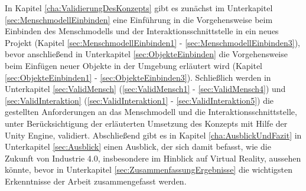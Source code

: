 \newline
In Kapitel \ref{cha:ValidierungDesKonzepts} gibt es zunächst im Unterkapitel \ref{sec:MenschmodellEinbinden} eine Einführung in die Vorgehensweise beim Einbinden des Menschmodells und der Interaktionsschnittstelle in ein neues Projekt (Kapitel \ref{sec:MenschmodellEinbinden1} - \ref{sec:MenschmodellEinbinden3}), bevor anschließend in Unterkapitel \ref{sec:ObjekteEinbinden} die Vorgehensweise beim Einfügen neuer Objekte in der Umgebung erläutert wird (Kapitel \ref{sec:ObjekteEinbinden1} - \ref{sec:ObjekteEinbinden3}). Schließlich werden in Unterkapitel \ref{sec:ValidMensch} (\ref{sec:ValidMensch1} - \ref{sec:ValidMensch4}) und \ref{sec:ValidInteraktion} (\ref{sec:ValidInteraktion1} - \ref{sec:ValidInteraktion5}) die gestellten Anforderungen an das Menschmodell und die Interaktionsschnittstelle, unter Berücksichtigung der erläuterten Umsetzung des Konzepts mit Hilfe der Unity Engine, validiert.
\newline
Abschließend gibt es in Kapitel \ref{cha:AusblickUndFazit} in Unterkapitel \ref{sec:Ausblick} einen Ausblick, der sich damit befasst, wie die Zukunft von Industrie 4.0, insbesondere im Hinblick auf Virtual Reality, aussehen könnte, bevor in Unterkapitel \ref{sec:ZusammenfassungErgebnisse} die wichtigsten Erkenntnisse der Arbeit zusammengefasst werden.


